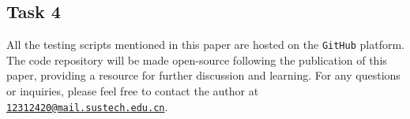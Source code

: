 \documentclass[12pt,a4paper,cs4size]{ctexart}
\begin{document}
\subsection*{Task 4}

All the testing scripts mentioned in this paper are hosted on the \texttt{GitHub} platform. The code repository\cite{github2024} will be made open-source following the publication of this paper, providing a resource for further discussion and learning. For any questions or inquiries, please feel free to contact the author at \href{mailto:12312420@mail.sustech.edu.cn}{\texttt{12312420@mail.sustech.edu.cn}}.

\renewcommand{\refname}{References}



\end{document}
